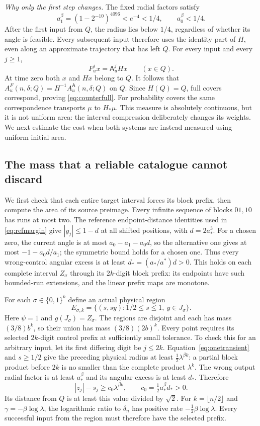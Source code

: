 \documentclass[11pt]{amsart}
\theoremstyle{definition}
\theoremstyle{remark}
\numberwithin{equation}{section}
\begin{document}
\smallskip
\emph{Why only the first step changes.}
The fixed radial factors satisfy
\[
a_1^\beta=(1-2^{-10})^{4096}<e^{-4}<1/4,
\qquad a_0^\beta<1/4.
\]
After the first input from $Q$, the radius lies below $1/4$,
regardless of whether its angle is feasible. Every subsequent input
therefore uses the identity part of $H$, even along an approximate
trajectory that has left $Q$. For every input and every $j\ge1$,
\begin{equation}\label{eq:onetransient}
F_u^j x=\mathsf A_u^j Hx\qquad(x\in Q).
\end{equation}
At time zero both $x$ and $Hx$ belong to $Q$. It follows that
$A_u^F(n,\delta;Q)=H^{-1}A_u^{\mathsf A}(n,\delta;Q)$ on $Q$.
Since $H(Q)=Q$, full covers correspond, proving
\eqref{eq:counterfull}. For probability covers the same correspondence transports $\mu$
to $H_*\mu$. This measure is absolutely continuous, but it is not
uniform area: the interval compression deliberately changes its
weights. We next estimate the cost when both systems are instead
measured using uniform initial area.

\subsection{The mass that a reliable catalogue cannot discard}
We first check that each entire target interval forces its block
prefix, then compute the area of its source preimage. Every infinite
sequence of blocks $01,10$ has runs at most two.
The reference endpoint-distance identities used in
\eqref{eq:refmargin} give $|y_j|\le1-d$ at all shifted positions,
with $d=2a_*^3$. For a chosen zero, the current angle is at most
$a_0-a_1-a_0d$, so the alternative one gives at most
$-1-a_0d/a_1$; the symmetric bound holds for a chosen one.
Thus every wrong-control angular excess is at least
$d_*=(a_*/a^*)d>0$.
This holds on each complete interval $Z_\sigma$ through its
$2k$-digit block prefix: its endpoints have such bounded-run
extensions, and the linear prefix maps are monotone.

For each $\sigma\in\{0,1\}^k$ define an actual physical region
\[
E_{\sigma,k}=\{(s,sy):1/2\le s\le1,\ y\in J_\sigma\}.
\]
Here $\psi=1$ and $g(J_\sigma)=Z_\sigma$.
The regions are disjoint and each has mass
$(3/8)b^k$, so their union has mass $(3/8)(2b)^k$.
Every point requires its selected $2k$-digit control prefix at
sufficiently small tolerance. To check this for an arbitrary input,
let its first differing digit be $j\le2k$.
Equation~\eqref{eq:onetransient} and $s\ge1/2$ give the
preceding physical radius at least
$\tfrac12\lambda^{\beta k}$: a partial block product before
$2k$ is no smaller than the complete product $\lambda^k$.
The wrong output radial factor is at least $a_*^\beta$ and
its angular excess is at least $d_*$. Therefore
\begin{equation}\label{eq:cantorwrong}
|z_j|-s_j\ge c_0\lambda^{\beta k},
\qquad c_0=\tfrac12a_*^\beta d_*>0.
\end{equation}
Its distance from $Q$ is at least this value divided by $\sqrt2$.
For $k=\lfloor n/2\rfloor$ and
$\gamma=-\beta\log\lambda$, the logarithmic ratio to $\delta_n$
has positive rate $-\tfrac12\beta\log\lambda$.
Every successful input from the region must therefore have the
selected prefix.
\end{document}
